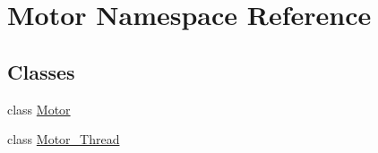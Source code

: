 \hypertarget{namespace_motor}{}\section{Motor Namespace Reference}
\label{namespace_motor}
\subsection*{Classes}
\begin{DoxyCompactItemize}
\item 
class \mbox{\hyperlink{class_motor_1_1_motor}{Motor}}
\item 
class \mbox{\hyperlink{class_motor_1_1_motor___thread}{Motor\+\_\+\+Thread}}
\end{DoxyCompactItemize}
